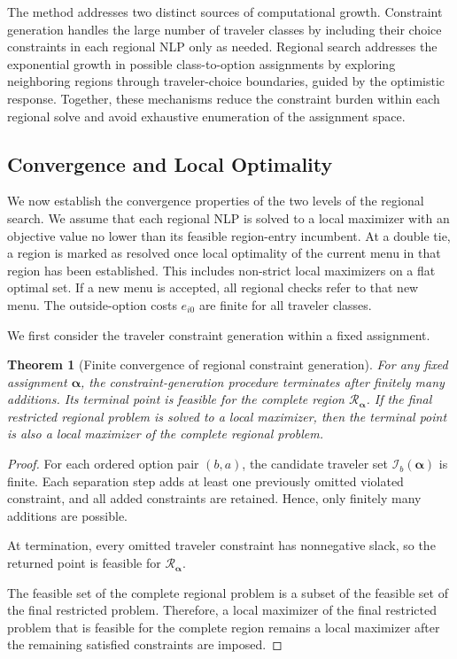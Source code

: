 \documentclass{article}
\newtheorem{theorem}{Theorem}
\begin{document}
The method addresses two distinct sources of computational growth.
Constraint generation handles the large number of traveler classes by
including their choice constraints in each regional NLP only as needed.
Regional search addresses the exponential growth in possible
class-to-option assignments by exploring neighboring regions through
traveler-choice boundaries, guided by the optimistic response. Together,
these mechanisms reduce the constraint burden within each regional solve
and avoid exhaustive enumeration of the assignment space.

\subsection{Convergence and Local Optimality}

We now establish the convergence properties of the two levels of the
regional search. We assume that each regional NLP is solved to a local
maximizer with an objective value no lower than its feasible region-entry
incumbent. At a double tie, a region is marked as resolved once local
optimality of the current menu in that region has been established.
This includes non-strict local maximizers on a flat optimal set.
If a new menu is accepted, all regional checks refer to that new menu.
The outside-option costs
$e_{i0}$ are finite for all traveler classes.

We first consider the traveler constraint generation within a fixed
assignment.

\begin{theorem}[Finite convergence of regional constraint generation]
For any fixed assignment $\bm\alpha$, the constraint-generation
procedure terminates after finitely many additions. Its terminal point
is feasible for the complete region $\mathcal R_{\bm\alpha}$. If the
final restricted regional problem is solved to a local maximizer, then
the terminal point is also a local maximizer of the complete regional
problem.
\label{thm:inner-convergence}
\end{theorem}

\begin{proof}
For each ordered option pair $(b,a)$, the candidate traveler set
$\mathcal I_b(\bm\alpha)$ is finite. Each separation step adds at least
one previously omitted violated constraint, and all added constraints
are retained. Hence, only finitely many additions are possible.

At termination, every omitted traveler constraint has nonnegative slack,
so the returned point is feasible for $\mathcal R_{\bm\alpha}$.

The feasible set of the complete regional problem is a subset of the
feasible set of the final restricted problem. Therefore, a local
maximizer of the final restricted problem that is feasible for the
complete region remains a local maximizer after the remaining satisfied
constraints are imposed.
\end{proof}
\end{document}
